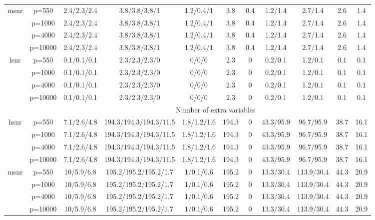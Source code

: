 \begin{table}[ht]
{\begin{tabular}{|c|c|ccccccccc|}
  \midrule\multirow{4}[2]{*}{msnr} & p=550 & 2.4/2.3/2.4 & 3.8/3.8/3.8/1 & 1.2/0.4/1 & 3.8 & 0.4 & 1.2/1.4 & 2.7/1.4 & 2.6 & 1.4 \\ 
   & p=1000 & 2.4/2.3/2.4 & 3.8/3.8/3.8/1 & 1.2/0.4/1 & 3.8 & 0.4 & 1.2/1.4 & 2.7/1.4 & 2.6 & 1.4 \\ 
   & p=4000 & 2.4/2.3/2.4 & 3.8/3.8/3.8/1 & 1.2/0.4/1 & 3.8 & 0.4 & 1.2/1.4 & 2.7/1.4 & 2.6 & 1.4 \\ 
   & p=10000 & 2.4/2.3/2.4 & 3.8/3.8/3.8/1 & 1.2/0.4/1 & 3.8 & 0.4 & 1.2/1.4 & 2.7/1.4 & 2.6 & 1.4 \\ 
  \midrule\multirow{4}[2]{*}{lsnr} & p=550 & 0.1/0.1/0.1 & 2.3/2.3/2.3/0 & 0/0/0 & 2.3 & 0 & 0.2/0.1 & 1.2/0.1 & 0.1 & 0.1 \\ 
   & p=1000 & 0.1/0.1/0.1 & 2.3/2.3/2.3/0 & 0/0/0 & 2.3 & 0 & 0.2/0.1 & 1.2/0.1 & 0.1 & 0.1 \\ 
   & p=4000 & 0.1/0.1/0.1 & 2.3/2.3/2.3/0 & 0/0/0 & 2.3 & 0 & 0.2/0.1 & 1.2/0.1 & 0.1 & 0.1 \\ 
   & p=10000 & 0.1/0.1/0.1 & 2.3/2.3/2.3/0 & 0/0/0 & 2.3 & 0 & 0.2/0.1 & 1.2/0.1 & 0.1 & 0.1 \\ 
   \midrule 
 \multicolumn{1}{|c}{} &       & \multicolumn{9}{c|}{Number of extra variables} \\
\midrule\multirow{4}[2]{*}{hsnr} & p=550 & 7.1/2.6/4.8 & 194.3/194.3/194.3/11.5 & 1.8/1.2/1.6 & 194.3 & 0 & 43.3/95.9 & 96.7/95.9 & 38.7 & 16.1 \\ 
   & p=1000 & 7.1/2.6/4.8 & 194.3/194.3/194.3/11.5 & 1.8/1.2/1.6 & 194.3 & 0 & 43.3/95.9 & 96.7/95.9 & 38.7 & 16.1 \\ 
   & p=4000 & 7.1/2.6/4.8 & 194.3/194.3/194.3/11.5 & 1.8/1.2/1.6 & 194.3 & 0 & 43.3/95.9 & 96.7/95.9 & 38.7 & 16.1 \\ 
   & p=10000 & 7.1/2.6/4.8 & 194.3/194.3/194.3/11.5 & 1.8/1.2/1.6 & 194.3 & 0 & 43.3/95.9 & 96.7/95.9 & 38.7 & 16.1 \\ 
  \midrule\multirow{4}[2]{*}{msnr} & p=550 & 10/5.9/6.8 & 195.2/195.2/195.2/1.7 & 1/0.1/0.6 & 195.2 & 0 & 13.3/30.4 & 113.9/30.4 & 44.3 & 20.9 \\ 
   & p=1000 & 10/5.9/6.8 & 195.2/195.2/195.2/1.7 & 1/0.1/0.6 & 195.2 & 0 & 13.3/30.4 & 113.9/30.4 & 44.3 & 20.9 \\ 
   & p=4000 & 10/5.9/6.8 & 195.2/195.2/195.2/1.7 & 1/0.1/0.6 & 195.2 & 0 & 13.3/30.4 & 113.9/30.4 & 44.3 & 20.9 \\ 
   & p=10000 & 10/5.9/6.8 & 195.2/195.2/195.2/1.7 & 1/0.1/0.6 & 195.2 & 0 & 13.3/30.4 & 113.9/30.4 & 44.3 & 20.9 \\ 

\end{tabular}}
\end{table}
